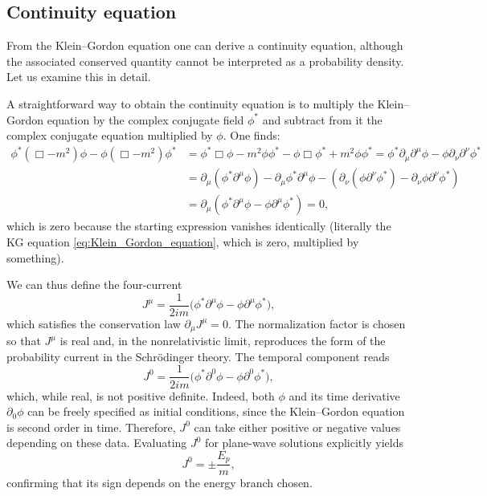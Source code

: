\subsection{Continuity equation}

From the Klein–Gordon equation one can derive a continuity equation, although the associated conserved quantity cannot be interpreted as a probability density. Let us examine this in detail.

A straightforward way to obtain the continuity equation is to multiply the Klein–Gordon equation by the complex conjugate field $\phi^*$ and subtract from it the complex conjugate equation multiplied by $\phi$. One finds:
\[
    \begin{aligned}
        \phi^* (\Box - m^2) \phi - \phi (\Box - m^2) \phi^* & = \phi^*\Box\phi - m^2 \phi\phi^* - \phi\Box\phi^* + m^2 \phi\phi^* = \phi^* \partial_\mu \partial^{\mu} \phi - \phi \partial_\nu \partial^{\nu} \phi^*                                                        \\
                                                            & = \partial_\mu \left(\phi^* \partial^{\mu} \phi\right) - \partial_\mu \phi^* \partial^{\mu} \phi - \left(\partial_\nu \left(\phi \partial^{\nu} \phi^*\right) - \partial_\nu \phi \partial^{\nu} \phi^*\right) \\
                                                            & =\partial_\mu \left( \phi^* \partial^\mu \phi - \phi \partial^\mu \phi^* \right) = 0,
    \end{aligned}
\]
which is zero because the starting expression vanishes identically (literally the KG equation \eqref{eq:Klein_Gordon_equation}, which is zero, multiplied by something).

We can thus define the four-current
\begin{equation}
    J^\mu = \frac{1}{2 i m} \big( \phi^* \partial^\mu \phi - \phi \partial^\mu \phi^* \big),
\end{equation}
which satisfies the conservation law $\partial_\mu J^\mu = 0$.
The normalization factor is chosen so that $J^\mu$ is real and, in the nonrelativistic limit, reproduces the form of the probability current in the Schrödinger theory.
The temporal component reads
\[
    J^0 = \frac{1}{2 i m} \big( \phi^* \partial^0 \phi - \phi \partial^0 \phi^* \big),
\]
which, while real, is not positive definite. Indeed, both $\phi$ and its time derivative $\partial_0 \phi$ can be freely specified as initial conditions, since the Klein–Gordon equation is second order in time. Therefore, $J^0$ can take either positive or negative values depending on these data. Evaluating $J^0$ for plane-wave solutions explicitly yields
\[
    J^0 = \pm \frac{E_p}{m},
\]
confirming that its sign depends on the energy branch chosen.

